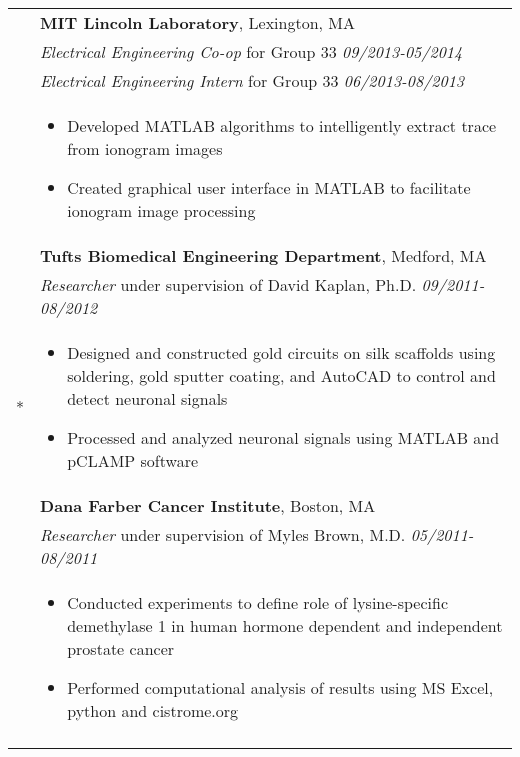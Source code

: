 \documentclass[letterpaper,11pt,oneside]{article}
\begin{document}
\begin{longtable}{@{} p{2.5cm} p{14.8cm}}
& \textbf{MIT Lincoln Laboratory}, Lexington, MA \\*
& \textit{Electrical Engineering Co-op} for Group 33 \hfill \textit{09/2013-05/2014} \\* 
& \textit{Electrical Engineering Intern} for Group 33 \hfill \textit{06/2013-08/2013} \\*
& 
\vspace{-7mm}
\begin{itemize}[leftmargin=.5cm]
	\setlength\itemsep{-0.3em}
	\item Developed MATLAB algorithms to intelligently extract trace from ionogram images
	\item Created graphical user interface in MATLAB to facilitate ionogram image processing
\end{itemize} 
\\

& \textbf{Tufts Biomedical Engineering Department}, Medford, MA \\*
& \textit{Researcher} under supervision of David Kaplan, Ph.D. \hfill \textit{09/2011-08/2012} \\ *
& 
\vspace{-7mm}
\begin{itemize}[leftmargin=.5cm]
	\setlength\itemsep{-0.3em}
	\item Designed and constructed gold circuits on silk scaffolds using soldering, gold sputter coating, and AutoCAD to control and detect neuronal signals
	\item Processed and analyzed neuronal signals using MATLAB and pCLAMP software
\end{itemize} 
\\

& \textbf{Dana Farber Cancer Institute}, Boston, MA \\
& \textit{Researcher} under supervision of Myles Brown, M.D. \hfill \textit{05/2011-08/2011} \\ 
& 
\vspace{-7mm}
\begin{itemize}[leftmargin=.5cm]
	\setlength\itemsep{-0.3em}
	\item Conducted experiments to define role of lysine-specific demethylase 1 in human hormone dependent and independent prostate cancer
	\item Performed computational analysis of results using MS Excel, python and cistrome.org
\end{itemize} 
\\
& \\


\end{longtable}
\end{document}
